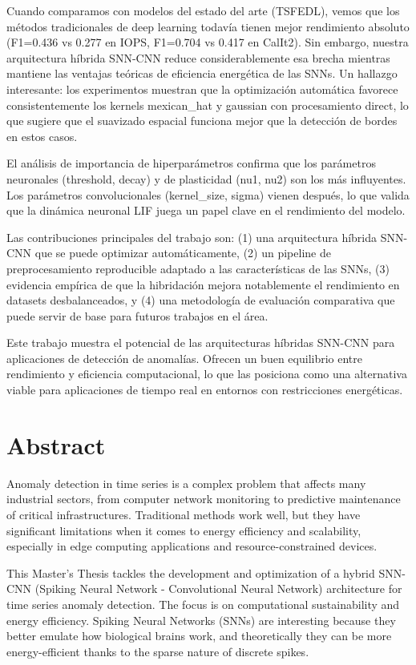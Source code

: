 Cuando comparamos con modelos del estado del arte (TSFEDL), vemos que los métodos tradicionales de deep learning todavía tienen mejor rendimiento absoluto (F1=0.436 vs 0.277 en IOPS, F1=0.704 vs 0.417 en CalIt2). Sin embargo, nuestra arquitectura híbrida SNN-CNN reduce considerablemente esa brecha mientras mantiene las ventajas teóricas de eficiencia energética de las SNNs. Un hallazgo interesante: los experimentos muestran que la optimización automática favorece consistentemente los kernels mexican\_hat y gaussian con procesamiento direct, lo que sugiere que el suavizado espacial funciona mejor que la detección de bordes en estos casos.

El análisis de importancia de hiperparámetros confirma que los parámetros neuronales (threshold, decay) y de plasticidad (nu1, nu2) son los más influyentes. Los parámetros convolucionales (kernel\_size, sigma) vienen después, lo que valida que la dinámica neuronal LIF juega un papel clave en el rendimiento del modelo.

Las contribuciones principales del trabajo son: (1) una arquitectura híbrida SNN-CNN que se puede optimizar automáticamente, (2) un pipeline de preprocesamiento reproducible adaptado a las características de las SNNs, (3) evidencia empírica de que la hibridación mejora notablemente el rendimiento en datasets desbalanceados, y (4) una metodología de evaluación comparativa que puede servir de base para futuros trabajos en el área.

Este trabajo muestra el potencial de las arquitecturas híbridas SNN-CNN para aplicaciones de detección de anomalías. Ofrecen un buen equilibrio entre rendimiento y eficiencia computacional, lo que las posiciona como una alternativa viable para aplicaciones de tiempo real en entornos con restricciones energéticas.

\chapter*{Abstract}
\label{chap:resumen}

Anomaly detection in time series is a complex problem that affects many industrial sectors, from computer network monitoring to predictive maintenance of critical infrastructures. Traditional methods work well, but they have significant limitations when it comes to energy efficiency and scalability, especially in edge computing applications and resource-constrained devices.

This Master's Thesis tackles the development and optimization of a hybrid SNN-CNN (Spiking Neural Network - Convolutional Neural Network) architecture for time series anomaly detection. The focus is on computational sustainability and energy efficiency. Spiking Neural Networks (SNNs) are interesting because they better emulate how biological brains work, and theoretically they can be more energy-efficient thanks to the sparse nature of discrete spikes.

